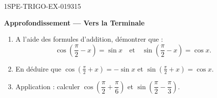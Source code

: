 \begin{exercice}{1SPE-TRIGO-EX-019}{3}{15}
\begin{center}\textbf{Approfondissement — Vers la Terminale}\end{center}
\begin{enumerate}
  \item A l'aide des formules d'addition, démontrer que :
  \[
    \cos\!\left(\frac{\pi}{2} - x\right) = \sin x \quad \text{et} \quad \sin\!\left(\frac{\pi}{2} - x\right) = \cos x.
  \]
  \item En déduire que $\cos\!\left(\frac{\pi}{2} + x\right) = -\sin x$ et $\sin\!\left(\frac{\pi}{2} + x\right) = \cos x$.
  \item Application : calculer $\cos\!\left(\dfrac{\pi}{2} + \dfrac{\pi}{6}\right)$ et $\sin\!\left(\dfrac{\pi}{2} - \dfrac{\pi}{3}\right)$.
\end{enumerate}
\end{exercice}
